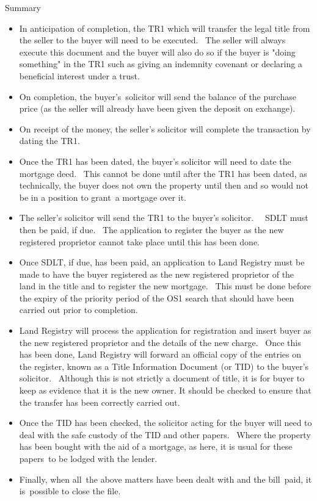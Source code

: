\documentclass[
]{article}
\providecommand{\tightlist}{%
  \setlength{\itemsep}{0pt}\setlength{\parskip}{0pt}}
\newenvironment{env-fc01b7b2-e70c-451d-8f3f-bb57ed8250fc}
{
    \savenotes\tcolorbox[blanker,breakable,left=5pt,borderline west={2pt}{-4pt}{gray}]
}
{
    \endtcolorbox\spewnotes
}
\begin{document}
\begin{env-fc01b7b2-e70c-451d-8f3f-bb57ed8250fc}

Summary

\begin{itemize}
\tightlist
\item
  In anticipation of completion, the TR1 which will transfer the legal
  title from the seller to the buyer will need to be executed.~ The
  seller will always execute this document and the buyer will also do so
  if the buyer is "doing something" in the TR1 such as giving an
  indemnity covenant or declaring a beneficial interest under a trust.~
\item
  On completion, the buyer's~solicitor will send the balance of the
  purchase price (as the seller will already have been given the deposit
  on exchange).~
\item
  On receipt of the money, the seller's solicitor will complete the
  transaction by dating the TR1.~~
\item
  Once the TR1 has been dated, the buyer's solicitor will need to date
  the mortgage deed.~ This cannot be done until after the TR1 has been
  dated, as technically, the buyer does not own the property until then
  and so would not be in a position to grant~a mortgage over it.~
\item
  The seller's solicitor will send the TR1 to the buyer's solicitor.~~
  SDLT must then be paid, if due.~ The application to register the buyer
  as the new registered proprietor cannot take place until this has been
  done.~
\item
  Once SDLT, if due, has been paid, an application to Land Registry must
  be made to have the buyer registered as the new registered proprietor
  of the land in the title and to register the new mortgage.~ This must
  be done before the expiry of the priority period of the OS1 search
  that should have been carried out prior to completion.~
\item
  Land Registry will process the application for registration and insert
  buyer as the new registered proprietor and the details of the new
  charge.~ Once this has been done, Land Registry will forward an
  official copy of the entries on the register, known as a Title
  Information Document (or TID) to the buyer's solicitor.~ Although this
  is not strictly a document of title, it is for buyer to keep as
  evidence that it is the new owner. It should be checked to ensure that
  the transfer has been correctly carried out.~
\item
  Once the TID has been checked, the solicitor acting for the buyer will
  need to deal with the safe custody of the TID and other papers.~ Where
  the property has been bought with the aid of a mortgage, as here, it
  is usual for these papers~to be lodged with the lender.~
\item
  Finally, when all~the above matters have been dealt with and the
  bill~paid, it is~possible to close the file.
\end{itemize}

\end{env-fc01b7b2-e70c-451d-8f3f-bb57ed8250fc}
\end{document}
